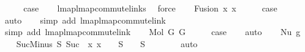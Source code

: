 \begin{isabellebody}
\ \ \isamarkupfalse%
\ \isamarkupfalse%
\ {\isacharquery}{\kern0pt}case\isanewline
\ \ \isamarkupfalse%
\ lmap{\isacharunderscore}{\kern0pt}lmap{\isacharunderscore}{\kern0pt}commute{\isacharunderscore}{\kern0pt}links\ \isamarkupfalse%
\ force\isanewline
{}\isamarkupfalse%
\isanewline
\ \ \isamarkupfalse%
\ {\isacharparenleft}{\kern0pt}Fusion\ x{}\ x{}{\isacharparenright}{\kern0pt}\isanewline
\ \ \isamarkupfalse%
\ \isamarkupfalse%
\ {\isacharquery}{\kern0pt}case\isanewline
\ \ \isamarkupfalse%
\ auto\isanewline
\ \ \isamarkupfalse%
\ {\isacharparenleft}{\kern0pt}simp\ add{\isacharcolon}{\kern0pt}\ lmap{\isacharunderscore}{\kern0pt}lmap{\isacharunderscore}{\kern0pt}commute{\isacharunderscore}{\kern0pt}link{\isacharparenright}{\kern0pt}\isanewline
\ \ \isamarkupfalse%
\ {\isacharparenleft}{\kern0pt}simp\ add{\isacharcolon}{\kern0pt}\ lmap{\isacharunderscore}{\kern0pt}lmap{\isacharunderscore}{\kern0pt}commute{\isacharunderscore}{\kern0pt}link{\isacharparenright}{\kern0pt}\isanewline
{}\isamarkupfalse%
\isanewline
\ \ \isamarkupfalse%
\ {\isacharparenleft}{\kern0pt}Mol\ G{}\ G{}{\isacharparenright}{\kern0pt}\isanewline
\ \ \isamarkupfalse%
\ \isamarkupfalse%
\ {\isacharquery}{\kern0pt}case\isanewline
\ \ \isamarkupfalse%
\ auto\isanewline
{}\isamarkupfalse%
\isanewline
\ \ \isamarkupfalse%
\ {\isacharparenleft}{\kern0pt}Nu\ g{\isacharparenright}{\kern0pt}\isanewline
\isanewline
\ \ \isamarkupfalse%
\ SucMinus{\isacharcolon}{\kern0pt}\ {\isachardoublequoteopen}{\isasymforall}S{\isachardot}{\kern0pt}\ Suc\ {\isacharbackquote}{\kern0pt}\ {\isacharparenleft}{\kern0pt}{\isasymlambda}x{\isachardot}{\kern0pt}\ x\ {\isacharminus}{\kern0pt}\ {}{\isacharparenright}{\kern0pt}\ {\isacharbackquote}{\kern0pt}\ {\isacharparenleft}{\kern0pt}S\ {\isacharminus}{\kern0pt}\ {\isacharbraceleft}{\kern0pt}{}{\isacharbraceright}{\kern0pt}{\isacharparenright}{\kern0pt}\ {\isacharequal}{\kern0pt}\ S\ {\isacharminus}{\kern0pt}\ {\isacharbraceleft}{\kern0pt}{}{\isacharbraceright}{\kern0pt}{\isachardoublequoteclose}\isanewline
\ \ \ \ \isamarkupfalse%
\ auto\isanewline
\ \ \ \ \isamarkupfalse%

\end{isabellebody}
